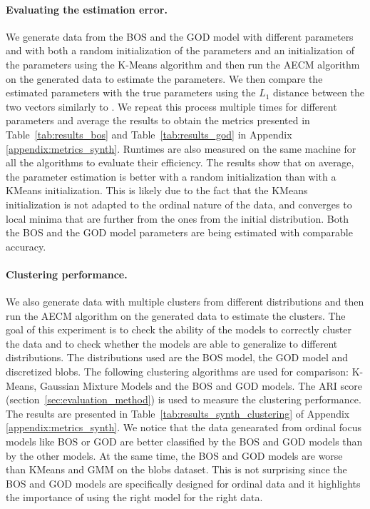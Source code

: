 \paragraph{Evaluating the estimation error.}
We generate data from the BOS and the GOD model with different parameters and with both a random initialization of the parameters and an initialization of the parameters using the K-Means algorithm and then run the AECM algorithm on the generated data to estimate the parameters. We then compare the estimated parameters with the true parameters using the $L_1$ distance between the two vectors similarly to \cite{biernacki2016model}. We repeat this process multiple times for different parameters and average the results to obtain the metrics presented in Table~\ref{tab:results_bos} and Table~\ref{tab:results_god} in Appendix \ref{appendix:metrics_synth}. Runtimes are also measured on the same machine for all the algorithms to evaluate their efficiency.
The results show that on average, the parameter estimation is better with a random initialization than with a KMeans initialization. This is likely due to the fact that the KMeans initialization is not adapted to the ordinal nature of the data, and converges to local minima that are further from the ones from the initial distribution. Both the BOS and the GOD model parameters are being estimated with comparable accuracy.

\paragraph{Clustering performance.}
We also generate data with multiple clusters from different distributions and then run the AECM algorithm on the generated data to estimate the clusters. The goal of this experiment is to check the ability of the models to correctly cluster the data and to check whether the models are able to generalize to different distributions.
The distributions used are the BOS model, the GOD model and discretized blobs.
The following clustering algorithms are used for comparison: K-Means, Gaussian Mixture Models and the BOS and GOD models. The ARI score (section~\ref{sec:evaluation_method}) is used to measure the clustering performance. The results are presented in Table~\ref{tab:results_synth_clustering} of Appendix \ref{appendix:metrics_synth}.
We notice that the data genearated from ordinal focus models like BOS or GOD are better classified by the BOS and GOD models than by the other models. At the same time, the BOS and GOD models are worse than KMeans and GMM on the blobs dataset. This is not surprising since the BOS and GOD models are specifically designed for ordinal data and it highlights the importance of using the right model for the right data.

